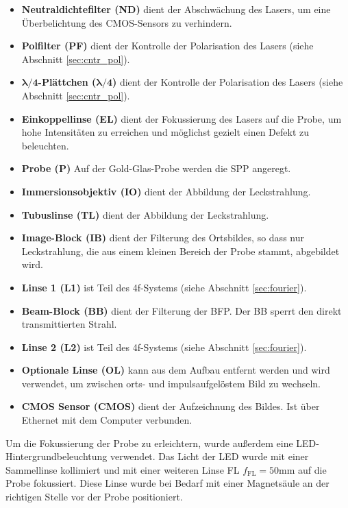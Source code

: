 \documentclass[titlepage,  ngerman]{article}
\begin{document}
		\begin{itemize}
			\item \textbf{Neutraldichtefilter (ND)} dient der Abschwächung des Lasers, um eine Überbelichtung des CMOS-Sensors zu verhindern.
			\item \textbf{Polfilter (PF)} dient der Kontrolle der Polarisation des Lasers (siehe Abschnitt \ref{sec:cntr_pol}).
			\item $\boldsymbol{\lambda / 4}$\textbf{-Plättchen (}$\boldsymbol{\lambda / 4}$\textbf{)} dient der Kontrolle der Polarisation des Lasers (siehe Abschnitt \ref{sec:cntr_pol}).
			\item \textbf{Einkoppellinse (EL)} dient der Fokussierung des Lasers auf die Probe, um hohe Intensitäten zu erreichen und möglichst gezielt einen Defekt zu beleuchten.
			\item \textbf{Probe (P)} Auf der Gold-Glas-Probe werden die SPP angeregt.
			\item \textbf{Immersionsobjektiv (IO)} dient der Abbildung der Leckstrahlung.
			\item \textbf{Tubuslinse (TL)} dient der Abbildung der Leckstrahlung.
			\item \textbf{Image-Block (IB)} dient der Filterung des Ortsbildes, so dass nur Leckstrahlung, die aus einem kleinen Bereich der Probe stammt, abgebildet wird.			
			\item \textbf{Linse 1 (L1)} ist Teil des 4f-Systems (siehe Abschnitt \ref{sec:fourier}).
			\item \textbf{Beam-Block (BB)} dient der Filterung der BFP. Der BB sperrt den direkt transmittierten Strahl.			
			\item \textbf{Linse 2 (L2)} ist Teil des 4f-Systems (siehe Abschnitt \ref{sec:fourier}).
			\item \textbf{Optionale Linse (OL)} kann aus dem Aufbau entfernt werden und wird verwendet, um zwischen orts- und impulsaufgelöstem Bild zu wechseln.
			\item \textbf{CMOS Sensor (CMOS)}  dient der Aufzeichnung des Bildes. Ist über Ethernet mit dem Computer verbunden.			
		\end{itemize}
		Um die Fokussierung der Probe zu erleichtern, wurde außerdem eine LED-Hintergrundbeleuchtung verwendet. Das Licht der LED wurde mit einer Sammellinse kollimiert und mit einer weiteren Linse FL $f_{\mathrm{FL}}=50\mathrm{mm}$ auf die  Probe fokussiert. Diese Linse wurde bei Bedarf mit einer Magnetsäule an der richtigen Stelle vor der Probe positioniert.
		
\end{document}
